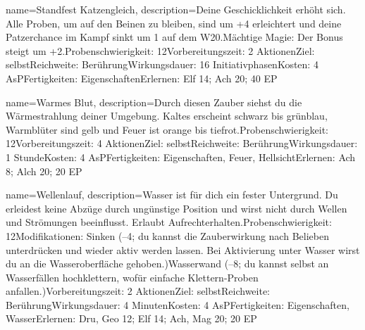 {
    name={Standfest Katzengleich},
    description={Deine Geschicklichkeit erhöht sich. Alle Proben, um auf den Beinen zu bleiben, sind um +4 erleichtert und deine Patzerchance im Kampf sinkt um 1 auf dem W20.\newline Mächtige Magie: Der Bonus steigt um +2.\newline Probenschwierigkeit: 12\newline Vorbereitungszeit: 2 Aktionen\newline Ziel: selbst\newline Reichweite: Berührung\newline Wirkungsdauer: 16 Initiativphasen\newline Kosten: 4 AsP\newline Fertigkeiten: Eigenschaften\newline Erlernen: Elf 14; Ach 20; 40 EP}
}


{
    name={Warmes Blut},
    description={Durch diesen Zauber siehst du die Wärmestrahlung deiner Umgebung. Kaltes erscheint schwarz bis grünblau, Warmblüter sind gelb und Feuer ist orange bis tiefrot.\newline Probenschwierigkeit: 12\newline Vorbereitungszeit: 4 Aktionen\newline Ziel: selbst\newline Reichweite: Berührung\newline Wirkungsdauer: 1 Stunde\newline Kosten: 4 AsP\newline Fertigkeiten: Eigenschaften, Feuer, Hellsicht\newline Erlernen: Ach 8; Alch 20; 20 EP}
}


{
    name={Wellenlauf},
    description={Wasser ist für dich ein fester Untergrund. Du erleidest keine Abzüge durch ungünstige Position und wirst nicht durch Wellen und Strömungen beeinflusst. Erlaubt Aufrechterhalten.\newline Probenschwierigkeit: 12\newline Modifikationen: Sinken (–4; du kannst die Zauberwirkung nach Belieben unterdrücken und wieder aktiv werden lassen. Bei Aktivierung unter Wasser wirst du an die Wasseroberfläche gehoben.)\newline Wasserwand (–8; du kannst selbst an Wasserfällen hochklettern, wofür einfache Klettern-Proben anfallen.)\newline Vorbereitungszeit: 2 Aktionen\newline Ziel: selbst\newline Reichweite: Berührung\newline Wirkungsdauer: 4 Minuten\newline Kosten: 4 AsP\newline Fertigkeiten: Eigenschaften, Wasser\newline Erlernen: Dru, Geo 12; Elf 14; Ach, Mag 20; 20 EP}
}


